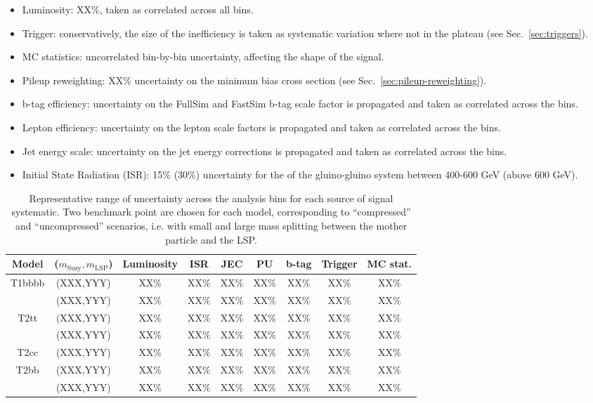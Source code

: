 \begin{itemize}
    \item Luminosity: XX\%, taken as correlated across all bins.
    \item Trigger: conservatively, the size of the inefficiency is taken as
        systematic variation where not in the plateau (see Sec.~\ref{sec:triggers}).
    \item MC statistics:  uncorrelated bin-by-bin uncertainty, affecting the
        shape of the signal.
    \item Pileup reweighting: XX\% uncertainty on the minimum bias cross section
        (see Sec.~\ref{sec:pileup-reweighting}).
    \item b-tag efficiency: uncertainty on the FullSim and FastSim b-tag scale
        factor is propagated and taken as correlated across the bins.
    \item Lepton efficiency: uncertainty on the lepton scale factors is
        propagated and taken as correlated across the bins.
    \item Jet energy scale: uncertainty on the jet energy corrections is
        propagated and taken as correlated across the bins.
    \item Initial State Radiation (ISR): 15\% (30\%) uncertainty for the \Pt of
        the gluino-gluino system between 400-600 GeV (above 600 GeV).
\end{itemize}

\begin{table}[h!]
    \caption{Representative range of uncertainty across the analysis bins for
        each source of signal systematic. Two benchmark point are chosen for
        each model, corresponding to ``compressed'' and ``uncompressed''
        scenarios, i.e. with small and large mass splitting between the mother
        particle and the LSP.}
    \label{tab:sig-systematics}
    \centering
    \begin{tabular}{ ccccccccc }
        \hline \hline
        Model & ($m_{\mathrm{Susy}},m_{\mathrm{LSP}}$) & Luminosity & ISR & JEC & PU & b-tag & Trigger & MC stat. \\ \hline
        \multirow{2}{*}{T1bbbb}
            & (XXX,YYY) & XX\% & XX\% & XX\% & XX\% & XX\% & XX\% & XX\% \\ 
            & (XXX,YYY) & XX\% & XX\% & XX\% & XX\% & XX\% & XX\% & XX\% \\
        \hline
        \multirow{2}{*}{T2tt}
            & (XXX,YYY) & XX\% & XX\% & XX\% & XX\% & XX\% & XX\% & XX\% \\ 
            & (XXX,YYY) & XX\% & XX\% & XX\% & XX\% & XX\% & XX\% & XX\% \\
        \hline
        \multirow{1}{*}{T2cc}
            & (XXX,YYY) & XX\% & XX\% & XX\% & XX\% & XX\% & XX\% & XX\% \\
        \hline
        \multirow{2}{*}{T2bb}
            & (XXX,YYY) & XX\% & XX\% & XX\% & XX\% & XX\% & XX\% & XX\% \\ 
            & (XXX,YYY) & XX\% & XX\% & XX\% & XX\% & XX\% & XX\% & XX\% \\
        \hline \hline
    \end{tabular}
\end{table}

